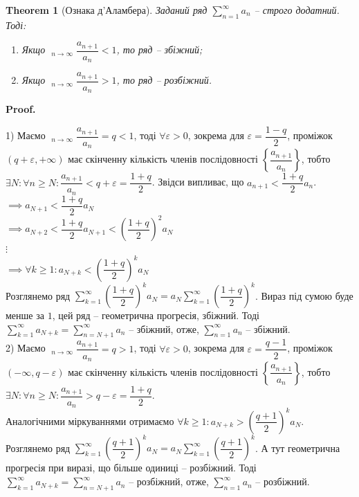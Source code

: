 \documentclass[a4paper, 10pt]{article}
\makeatletter
\DeclareMathOperator*\uplim{\overline{lim}}
\DeclareMathOperator*\downlim{\underline{lim}}
\def\huge{\displaystyle}
\theoremstyle{theoremdd}
\newtheorem{theorem}{Theorem}[subsection]
\theoremstyle{theoremdd}
\theoremstyle{theoremdd}
\theoremstyle{theoremdd}
\theoremstyle{theoremdd}
\theoremstyle{theoremdd}
\theoremstyle{theoremdd}
\theoremstyle{theoremdd}
\theoremstyle{theoremdd}
\renewenvironment{proof}[1][Proof.\\]{\par
\pushQED{\hfill \qed}%
\normalfont \topsep6\p@\@plus6\p@\relax
\trivlist
\item\relax
{\bfseries
#1\@addpunct{.}}\hspace\labelsep\ignorespaces
}{%
\popQED\endtrivlist\@endpefalse
}
\makeatother
\begin{document}
\begin{theorem}[Ознака д'Аламбера]
Заданий ряд $\huge \sum_{n=1}^{\infty} a_n$ -- строго додатний. Тоді:
\begin{enumerate}[nosep,wide=0pt,label={\arabic*)}]
\item Якщо $\huge\uplim_{n \to \infty} \dfrac{a_{n+1}}{a_n} <1$, то ряд -- збіжний;
\item Якщо $\huge\downlim_{n \to \infty} \dfrac{a_{n+1}}{a_n} >1$, то ряд -- розбіжний.
\end{enumerate}
\end{theorem}

\begin{proof}
1) Маємо $\huge\uplim_{n \to \infty} \dfrac{a_{n+1}}{a_n} = q < 1$, тоді $\forall \varepsilon > 0$, зокрема для $\varepsilon = \dfrac{1-q}{2}$, проміжок $(q+\varepsilon,+\infty)$ має скінченну кількість членів послідовності $\left\{ \dfrac{a_{n+1}}{a_n} \right\}$, тобто $\exists N: \forall n \geq N: \dfrac{a_{n+1}}{a_n} < q+\varepsilon = \dfrac{1+q}{2}$. Звідси випливає, що $a_{n+1} < \dfrac{1+q}{2}a_n$.\\
$\implies a_{N+1} < \dfrac{1+q}{2}a_N$\\
$\implies a_{N+2} < \dfrac{1+q}{2}a_{N+1} < \left( \dfrac{1+q}{2} \right)^2 a_N$\\
$\vdots$\\
$\implies \forall k \geq 1: a_{N+k} < \left( \dfrac{1+q}{2} \right)^k a_N$\\
Розглянемо ряд $\huge \sum_{k=1}^{\infty} \left( \dfrac{1+q}{2} \right)^k a_N = a_N \sum_{k=1}^{\infty} \left( \dfrac{1+q}{2} \right)^k$. Вираз під сумою буде менше за $1$, цей ряд -- геометрична прогресія, збіжний. Тоді $\huge \sum_{k=1}^{\infty} a_{N+k} = \sum_{n = N+1}^{\infty} a_{n}$ -- збіжний, отже, $\huge \sum_{n = 1}^{\infty} a_n$ -- збіжний.
\bigskip \\
2) Маємо $\huge\downlim_{n \to \infty} \dfrac{a_{n+1}}{a_n} = q > 1$, тоді $\forall \varepsilon > 0$, зокрема для $\varepsilon = \dfrac{q-1}{2}$, проміжок $(-\infty,q-\varepsilon)$ має скінченну кількість членів послідовності $\left\{ \dfrac{a_{n+1}}{a_n} \right\}$, тобто $\exists N: \forall n \geq N: \dfrac{a_{n+1}}{a_n} > q-\varepsilon = \dfrac{1+q}{2}$.\\
Аналогічними міркуваннями отримаємо $\forall k \geq 1: a_{N+k} > \left( \dfrac{q+1}{2} \right)^k a_N$.\\
Розглянемо ряд $\huge \sum_{k=1}^{\infty} \left( \dfrac{q+1}{2} \right)^k a_N = a_N \sum_{k=1}^{\infty} \left( \dfrac{q+1}{2} \right)^k$. А тут геометрична прогресія при виразі, що більше одиниці -- розбіжний. Тоді $\huge \sum_{k=1}^{\infty} a_{N+k} = \sum_{n = N+1}^{\infty} a_{n}$ -- розбіжний, отже, $\huge \sum_{n = 1}^{\infty} a_n$ -- розбіжний.
\end{proof}
\end{document}
